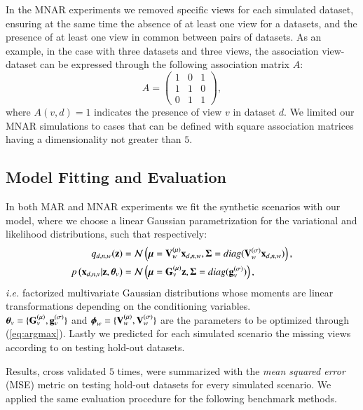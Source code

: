 In the MNAR experiments we removed specific views for each simulated dataset, ensuring at the same time the absence of at least one view for a datasets, and the presence of at least one view in common between pairs of datasets.
As an example, in the case with three datasets and three views, the association view-dataset can be expressed through the following association matrix $A$:
\begin{equation}
A = 
\begin{pmatrix}
1 & 0 & 1 \\
1 & 1 & 0 \\
0 & 1 & 1 
\end{pmatrix},
\end{equation}
where $A(v,d)=1$ indicates the presence of view $v$ in dataset $d$.
We limited our MNAR simulations to cases that can be defined with square association matrices having a dimensionality not greater than $5$.

\subsection{Model Fitting and Evaluation}

In both MAR and MNAR experiments we fit the synthetic scenarios with our model, where we choose a linear Gaussian parametrization for the variational and likelihood distributions, such that respectively:
\begin{align}
\label{eq:encoder}
q_{d,n,w}(\mathbf{z}) &= \mathcal{N}\left(\boldsymbol{\mu}=\mathbf{V}_w^{(\mu)} \mathbf{x}_{d,n,w}, \boldsymbol{\Sigma} = diag(\mathbf{V}_w^{(\sigma)} \mathbf{x}_{d,n,w})\right), \\
\label{eq:decoder}
p\left(\mathbf{x}_{d,n,v}|\mathbf{z},\boldsymbol{\theta}_v\right) &= \mathcal{N}\left(\boldsymbol{\mu} = \mathbf{G}_v^{(\mu)} \mathbf{z}, \boldsymbol{\Sigma} = diag(\mathbf{g}_v^{(\sigma)})\right),
\end{align}
\textit{i.e.} factorized multivariate Gaussian distributions whose moments are linear transformations depending on the conditioning variables. \\
$\boldsymbol{\theta}_v = \{\mathbf{G}_v^{(\mu)}, \mathbf{g}_v^{(\sigma)}\}$ and $\boldsymbol{\phi}_w=\{\mathbf{V}_w^{(\mu)}, \mathbf{V}_w^{(\sigma)}\}$ are the parameters to be optimized through (\ref{eq:argmax}).
Lastly we predicted for each simulated scenario the missing views according to  on testing hold-out datasets.

Results, cross validated $5$ times, were summarized with the \textit{mean squared error} (MSE) metric on testing hold-out datasets for every simulated scenario.
We applied the same evaluation procedure for the following benchmark methods.


